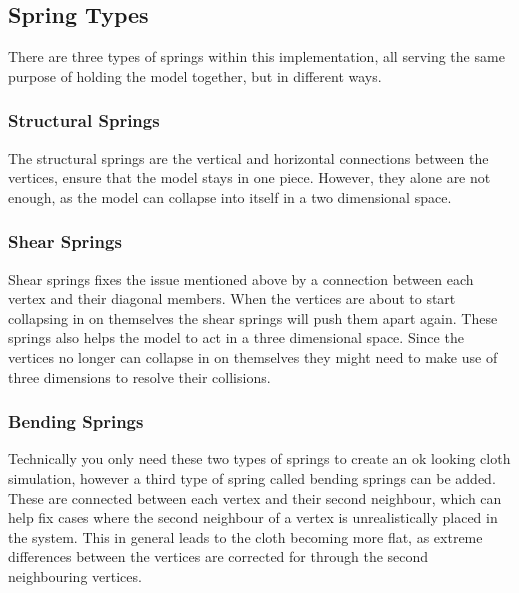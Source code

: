 \begin{figure}
    \label{fig:my_cloth_implementation_springs}
\end{figure}


\subsection{Spring Types}
There are three types of springs within this implementation, all serving the same purpose of holding the model together,
but in different ways.

\subsubsection{Structural Springs}
The structural springs are the vertical and horizontal connections between the vertices,
ensure that the model stays in one piece.
However, they alone are not enough, as the model can collapse into itself in a two dimensional space.

\subsubsection{Shear Springs}
Shear springs fixes the issue mentioned above by a connection between each vertex and their diagonal members.
When the vertices are about to start collapsing in on themselves the shear springs will push them apart again.
These springs also helps the model to act in a three dimensional space.
Since the vertices no longer can collapse in on themselves they might need to make use of three dimensions to
resolve their collisions.

\subsubsection{Bending Springs}
Technically you only need these two types of springs to create an ok looking cloth simulation,
however a third type of spring called bending springs can be added.
These are connected between each vertex and their second neighbour,
which can help fix cases where the second neighbour of a vertex is unrealistically placed in the system.
This in general leads to the cloth becoming more flat, as extreme differences between the vertices are corrected for
through the second neighbouring vertices.

